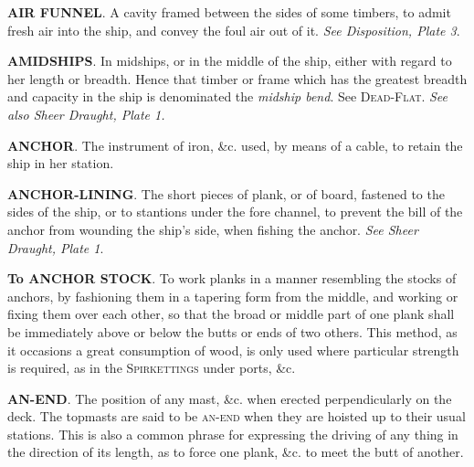 \textbf{AIR FUNNEL}. A cavity framed between the sides of some timbers, to admit fresh air into the ship, and convey the foul air out of it. \textit{See Disposition, Plate 3}. 

\textbf{AMIDSHIPS}. In midships, or in the middle of the ship, either with regard to her length or breadth. Hence that timber or frame which has the greatest breadth and capacity in the ship is denominated the \textit{midship bend}. See \textsc{Dead-Flat}. \textit{See also Sheer Draught, Plate 1.} 

\textbf{ANCHOR}. The instrument of iron, \&c. used, by means of a cable, to retain the ship in her station. 

\textbf{ANCHOR-LINING}. The short pieces of plank, or of board, fastened to the sides of the ship, or to stantions under the fore channel, to prevent the bill of the anchor from wounding the ship's side, when fishing the anchor. \textit{See Sheer Draught, Plate 1}. 

\textbf{To ANCHOR STOCK}. To work planks in a manner resembling the stocks of anchors, by fashioning them in a tapering form from the middle, and working or fixing them over each other, so that the broad or middle part of one plank shall be immediately above or below the butts or ends of two others. This method, as it occasions a great consumption of wood, is only used where particular strength is required, as in the \textsc{Spirkettings} under ports, \&c. 

\textbf{AN-END}. The position of any mast, \&c. when erected perpendicularly on the deck. The topmasts are said to be \textsc{an-end} when they are hoisted up to their usual stations. This is also a common phrase for expressing the driving of any thing in the direction of its length, as to force one plank, \&c. to meet the butt of another. 

